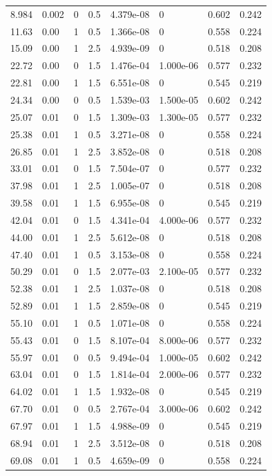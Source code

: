 \documentclass[preview]{standalone}
\begin{document}
{{\begin{tabular}{L{1.2cm}C{1.2cm} C{0.3cm}C{0.5cm} C{1.4cm}C{1.4cm} C{1.4cm}C{1.4cm}}
  8.984  &  0.002  & 0     & 0.5 &  4.379e-08  & 0  & 0.602 &  0.242   \\ 
  11.63  &  0.00  & 1     & 0.5 &  1.366e-08  & 0  & 0.558 &  0.224   \\ 
  15.09  &  0.00  & 1     & 2.5 &  4.939e-09  & 0  & 0.518 &  0.208   \\ 
  22.72  &  0.00  & 0     & 1.5 &  1.476e-04  & 1.000e-06  & 0.577 &  0.232   \\ 
  22.81  &  0.00  & 1     & 1.5 &  6.551e-08  & 0  & 0.545 &  0.219   \\ 
  24.34  &  0.00  & 0     & 0.5 &  1.539e-03  & 1.500e-05  & 0.602 &  0.242   \\ 
  25.07  &  0.01  & 0     & 1.5 &  1.309e-03  & 1.300e-05  & 0.577 &  0.232   \\ 
  25.38  &  0.01  & 1     & 0.5 &  3.271e-08  & 0  & 0.558 &  0.224   \\ 
  26.85  &  0.01  & 1     & 2.5 &  3.852e-08  & 0  & 0.518 &  0.208   \\ 
  33.01  &  0.01  & 0     & 1.5 &  7.504e-07  & 0  & 0.577 &  0.232   \\ 
  37.98  &  0.01  & 1     & 2.5 &  1.005e-07  & 0  & 0.518 &  0.208   \\ 
  39.58  &  0.01  & 1     & 1.5 &  6.955e-08  & 0  & 0.545 &  0.219   \\ 
  42.04  &  0.01  & 0     & 1.5 &  4.341e-04  & 4.000e-06  & 0.577 &  0.232   \\ 
  44.00  &  0.01  & 1     & 2.5 &  5.612e-08  & 0  & 0.518 &  0.208   \\ 
  47.40  &  0.01  & 1     & 0.5 &  3.153e-08  & 0  & 0.558 &  0.224   \\ 
  50.29  &  0.01  & 0     & 1.5 &  2.077e-03  & 2.100e-05  & 0.577 &  0.232   \\ 
  52.38  &  0.01  & 1     & 2.5 &  1.037e-08  & 0  & 0.518 &  0.208   \\ 
  52.89  &  0.01  & 1     & 1.5 &  2.859e-08  & 0  & 0.545 &  0.219   \\ 
  55.10  &  0.01  & 1     & 0.5 &  1.071e-08  & 0  & 0.558 &  0.224   \\ 
  55.43  &  0.01  & 0     & 1.5 &  8.107e-04  & 8.000e-06  & 0.577 &  0.232   \\ 
  55.97  &  0.01  & 0     & 0.5 &  9.494e-04  & 1.000e-05  & 0.602 &  0.242   \\ 
  63.04  &  0.01  & 0     & 1.5 &  1.814e-04  & 2.000e-06  & 0.577 &  0.232   \\ 
  64.02  &  0.01  & 1     & 1.5 &  1.932e-08  & 0  & 0.545 &  0.219   \\ 
  67.70  &  0.01  & 0     & 0.5 &  2.767e-04  & 3.000e-06  & 0.602 &  0.242   \\ 
  67.97  &  0.01  & 1     & 1.5 &  4.988e-09  & 0  & 0.545 &  0.219   \\ 
  68.94  &  0.01  & 1     & 2.5 &  3.512e-08  & 0  & 0.518 &  0.208   \\ 
  69.08  &  0.01  & 1     & 0.5 &  4.659e-09  & 0  & 0.558 &  0.224   \\ 
\hline 
\end{tabular} 

}}
\end{document}
